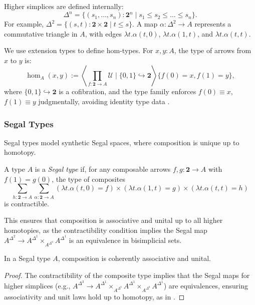 \documentclass{article}
\begin{document}
Higher simplices are defined internally:
\[
\Delta^n = \{(s_1, \dots, s_n) : \mathbf{2}^n \mid s_1 \leq s_2 \leq \dots \leq s_n\}.
\]
For example, $\Delta^2 = \{(s,t) : \mathbf{2} \times \mathbf{2} \mid t \leq s\}$. A map $\alpha : \Delta^2 \to A$ represents a commutative triangle in $A$, with edges $\lambda t . \alpha(t,0)$, $\lambda t . \alpha(1,t)$, and $\lambda t . \alpha(t,t)$.

We use extension types to define hom-types. For $x, y : A$, the type of arrows from $x$ to $y$ is:
\[
\operatorname{hom}_A(x, y) := \left\langle \prod_{f : \mathbf{2} \to A} \mathcal{U} \mid \{0,1\} \hookrightarrow \mathbf{2} \right\rangle \{ f(0) = x, f(1) = y \},
\]
where $\{0,1\} \hookrightarrow \mathbf{2}$ is a cofibration, and the type family enforces $f(0) \equiv x$, $f(1) \equiv y$ judgmentally, avoiding identity type data \cite{Shu15}.

\subsubsection{Segal Types}

Segal types model synthetic Segal spaces, where composition is unique up to homotopy.

\begin{definition}
A type $A$ is a \emph{Segal type} if, for any composable arrows $f, g : \mathbf{2} \to A$ with $f(1) = g(0)$, the type of composites
\[
\sum_{h : \mathbf{2} \to A} \sum_{\alpha : \mathbf{2} \to A} \left( \lambda t . \alpha(t,0) = f \right) \times \left( \lambda t . \alpha(1,t) = g \right) \times \left( \lambda t . \alpha(t,t) = h \right)
\]
is contractible.
\end{definition}

This ensures that composition is associative and unital up to all higher homotopies, as the contractibility condition implies the Segal map $A^{\Delta^2} \to A^{\Delta^1} \times_{A^{\Delta^0}} A^{\Delta^1}$ is an equivalence in bisimplicial sets.

\begin{theorem}
In a Segal type $A$, composition is coherently associative and unital.
\end{theorem}
\begin{proof}
The contractibility of the composite type implies that the Segal maps for higher simplices (e.g., $A^{\Delta^3} \to A^{\Delta^1} \times_{A^{\Delta^0}} A^{\Delta^1} \times_{A^{\Delta^0}} A^{\Delta^1}$) are equivalences, ensuring associativity and unit laws hold up to homotopy, as in \cite{Rez01}.
\end{proof}
\end{document}

